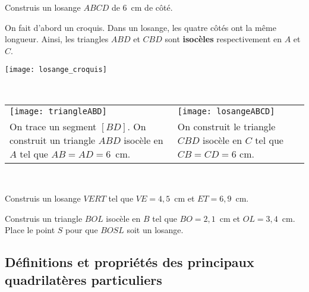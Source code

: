 \begin{methode*1}

\begin{exemple*1}
Construis un losange $ABCD$ de 6 cm de côté.\\[1em]
\begin{minipage}[c]{0.7\linewidth}
On fait d'abord un croquis. Dans un losange, les quatre côtés ont la même longueur. Ainsi, les triangles $ABD$ et $CBD$ sont \textbf{isocèles} respectivement en $A$ et $C$.
 \end{minipage} \hfill%
 \begin{minipage}[c]{0.24\linewidth}
  \texttt{[image: losange\_croquis]}
  \end{minipage} \\
  
\begin{tabularx}{\textwidth}{X|X}
 \qquad \texttt{[image: triangleABD]} & \texttt{[image: losangeABCD]} \\ 
 On trace un segment $[BD]$. On construit un triangle $ABD$ isocèle en $A$ tel que $AB = AD = 6$ cm. & On construit le triangle $CBD$ isocèle en $C$ tel que $CB = CD = 6$ cm. \\
\end{tabularx} \\

 \end{exemple*1}

\exercice
Construis un losange $VERT$ tel que $VE = 4,5$ cm et $ET = 6,9$ cm.

\exercice
Construis un triangle $BOL$ isocèle en $B$ tel que $BO = 2,1$ cm et $OL = 3,4$ cm. Place le point $S$ pour que $BOSL$ soit un losange.

\end{methode*1}

\subsection{Définitions et propriétés des principaux quadrilatères particuliers}

